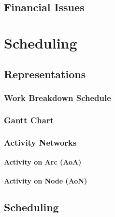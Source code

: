     \section{Financial Issues} %

\chapter{Scheduling} %

    \section{Representations} %

        \subsection{Work Breakdown Schedule} %

        \subsection{Gantt Chart} %

        \subsection{Activity Networks} %

            \subsubsection{Activity on Arc (AoA)} %

            \subsubsection{Activity on Node (AoN)} %

    \section{Scheduling} %

